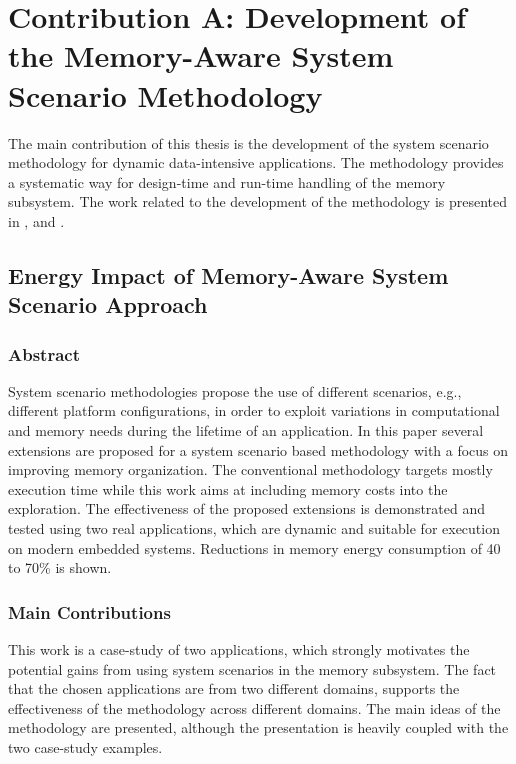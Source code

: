 \section{Contribution A: Development of the Memory-Aware System Scenario Methodology}

The main contribution of this thesis is the development of the system scenario methodology for dynamic data-intensive applications.
The methodology provides a systematic way for design-time and run-time handling of the memory subsystem.
The work related to the development of the methodology is presented in \cite{Fil12}, \cite{filippopoulos2013exploration} and \cite{zompakis2014systematic}.

\subsection{Energy Impact of Memory-Aware System Scenario Approach}

\subsubsection{Abstract}

System scenario methodologies propose the use of different scenarios, e.g., different platform configurations, in order to exploit variations in computational and memory needs during the lifetime of an application. In this paper several extensions are proposed for a system scenario based methodology with a focus on improving memory organization. The conventional methodology targets mostly execution time while this work aims at including memory costs into the exploration. The effectiveness of the proposed extensions is demonstrated and tested using two real applications, which are dynamic and suitable for execution on modern embedded systems. Reductions in memory energy consumption of 40 to 70\% is shown.

\subsubsection{Main Contributions}

This work is a case-study of two applications, which strongly motivates the potential gains from using system scenarios in the memory subsystem.
The fact that the chosen applications are from two different domains, supports the effectiveness of the methodology across different domains.
The main ideas of the methodology are presented, although the presentation is heavily coupled with the two case-study examples.

